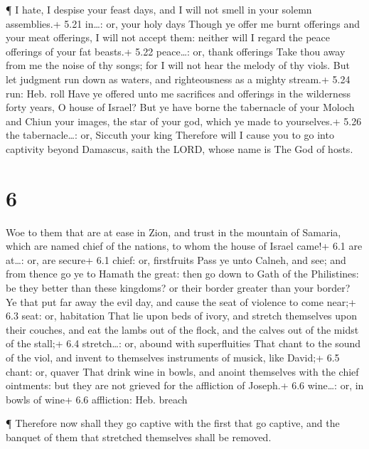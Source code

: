  ¶ I hate, I despise your feast days, and I will not smell
in your solemn assemblies.+ 5.21 in\ldots: or, your holy days
 Though ye offer me burnt offerings and your meat
offerings, I will not accept them: neither will I regard the peace
offerings of your fat beasts.+ 5.22 peace\ldots: or, thank offerings
 Take thou away from me the noise of thy songs; for I will
not hear the melody of thy viols.  But let judgment run
down as waters, and righteousness as a mighty stream.+ 5.24 run: Heb.
roll  Have ye offered unto me sacrifices and offerings in
the wilderness forty years, O house of Israel?  But ye have
borne the tabernacle of your Moloch and Chiun your images, the star of
your god, which ye made to yourselves.+ 5.26 the tabernacle\ldots: or,
Siccuth your king  Therefore will I cause you to go into
captivity beyond Damascus, saith the LORD, whose name is The God of
hosts.

\hypertarget{section-5}{%
\section{6}\label{section-5}}

 Woe to them that are at ease in Zion, and trust in the
mountain of Samaria, which are named chief of the nations, to whom the
house of Israel came!+ 6.1 are at\ldots: or, are secure+ 6.1 chief: or,
firstfruits  Pass ye unto Calneh, and see; and from thence
go ye to Hamath the great: then go down to Gath of the Philistines: be
they better than these kingdoms? or their border greater than your
border?  Ye that put far away the evil day, and cause the
seat of violence to come near;+ 6.3 seat: or, habitation 
That lie upon beds of ivory, and stretch themselves upon their couches,
and eat the lambs out of the flock, and the calves out of the midst of
the stall;+ 6.4 stretch\ldots: or, abound with superfluities
 That chant to the sound of the viol, and invent to
themselves instruments of musick, like David;+ 6.5 chant: or, quaver
 That drink wine in bowls, and anoint themselves with the
chief ointments: but they are not grieved for the affliction of Joseph.+
6.6 wine\ldots: or, in bowls of wine+ 6.6 affliction: Heb. breach

 ¶ Therefore now shall they go captive with the first that
go captive, and the banquet of them that stretched themselves shall be
removed.

